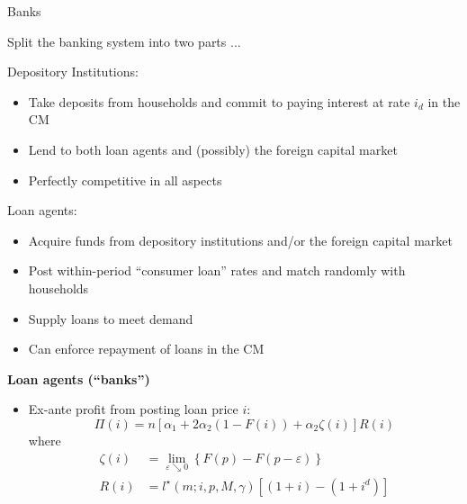 \documentclass[10pt,english,slidetop,compress,
              blue,mathserif,color=option]{beamer}
\theoremstyle{plain}
\theoremstyle{definition}
\begin{document}
\begin{frame}[allowframebreaks]{Banks}

  Split the banking system into two parts ...

  \bigskip

  Depository Institutions:
  \begin{itemize}
    \item Take deposits from households and commit to paying interest at rate $i_{d}$ in the CM
    \item Lend to both loan agents and (possibly) the foreign capital market
    \item Perfectly competitive in all aspects
  \end{itemize}

  Loan agents:
  \begin{itemize}
    \item Acquire funds from depository institutions and/or the foreign capital market
    \item Post within-period “consumer loan” rates and match randomly with households
    \item Supply loans to meet demand 
    \item Can enforce repayment of loans in the CM
  \end{itemize}

  \break

  \textbf{Loan agents (``banks'')}

  \begin{itemize}
    \item Ex-ante profit from posting loan price $i$:
      \begin{equation}
      \Pi\left(i\right) %
      =
      n
      \left[
          \alpha_{1}+2\alpha_{2}
          \left(1-F\left(i\right)\right)+\alpha_{2}\zeta\left(i\right)
        \right]
        R\left(i\right)
        \label{eq:BJ Bank profit function}
      \end{equation}
      where
      \begin{align}
        \zeta\left(i\right)
        & =
        \lim_{\varepsilon\searrow0}
        \left\{ F\left(p\right)-F\left(p-\varepsilon\right)\right\} \label{eq:BJ bank measure of visits under duplicate price}
        \\
        R\left(i\right)
        & =
        l^{\star}\left(m;i,p,M,\gamma\right)
        \left[\left(1+i\right)-\left(1+i^{d}\right)\right]
        \label{eq:BJ Bank profit per customer}
      \end{align}


\end{itemize}
\end{frame}
\end{document}
